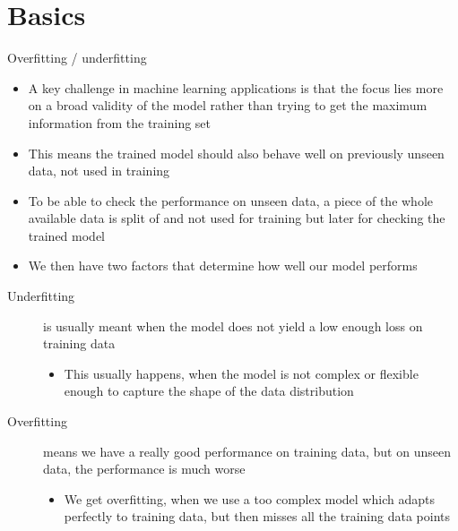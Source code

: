   \section{Basics}

    \begin{frame}{Overfitting / underfitting}
      \begin{itemize}
        \item A key challenge in machine learning applications is that the focus lies more on a broad validity of the model rather than trying to get the maximum information from the training set
        \item This means the trained model should also behave well on previously unseen data, not used in training
        \item To be able to check the performance on unseen data, a piece of the whole available data is split of and not used for training but later for checking the trained model
        \item We then have two factors that determine how well our model performs
      \end{itemize}
      \begin{description}
        \item[Underfitting] is usually meant when the model does not yield a low enough loss on training data
        \begin{itemize}
          \item This usually happens, when the model is not complex or flexible enough to capture the shape of the data distribution
        \end{itemize}
        \item[Overfitting] means we have a really good performance on training data, but on unseen data, the performance is much worse
          \begin{itemize}
            \item We get overfitting, when we use a too complex model which adapts perfectly to training data, but then misses all the training data points
          \end{itemize}
      \end{description}
    \end{frame}

